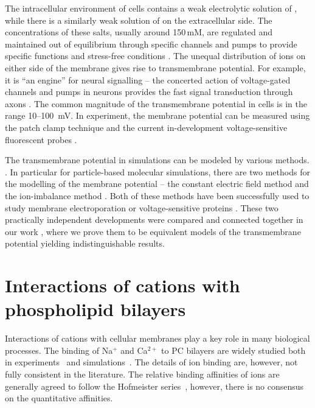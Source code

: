 The intracellular environment of cells contains a weak electrolytic solution of , 
while there is a similarly weak solution of  on the extracellular side. 
The concentrations of these salts, usually around 150\,mM, 
are regulated and maintained out of equilibrium through specific channels and pumps 
to provide specific functions and stress-free conditions \citep{Bezanilla2008, Knudsen_book2002}. 
The unequal distribution of ions on either side of the membrane
gives rise to transmembrane potential. 
For example, it is ``an engine'' for neural signalling --
the concerted action of voltage-gated channels and pumps in neurons 
provides the fast signal transduction through axons \citep{Knudsen_book2002, Storace2015, Sung2015}. 
The common magnitude of the transmembrane potential in cells is in the range 10--100~mV. 
In experiment, the membrane potential can be measured using the patch clamp technique \citep{Bezanilla2008}
and the current in-development voltage-sensitive fluorescent probes \citep{Storace2015, Sung2015}. 

The transmembrane potential in simulations can be modeled by various methods. \citep{Roux1997,Tieleman2001,Sin2015, Roux2008,Gumbart2012, sachs04_potential,Delemotte2008}.
In particular for particle-based molecular simulations, 
there are two methods for the modelling of the membrane potential --
 the constant electric field method \citep{Roux1997,Roux2008,Gumbart2012} and
 the ion-imbalance method \citep{sachs04_potential,Delemotte2008}. 
Both of these methods have been successfully used to study membrane electroporation or voltage-sensitive proteins \citep{Vargas2012, bockmann_kinetics_2008, gumbart_constant_2012, kutzner_computational_2011, casciola_molecular_2014}. 
These two practically independent developments were compared and connected together in our work \citep{melcr16},
where we prove them to be equivalent models of the transmembrane potential yielding indistinguishable results. 






\section{Interactions of cations with phospholipid bilayers}

Interactions of cations with cellular membranes play a key role in many biological processes. 
The binding of Na$^+$ and Ca$^{2+}$ to PC bilayers are widely studied both in
experiments~\citep{akutsu81,altenbach84,seelig90,cevc90,tocanne90,binder02,pabst07,uhrikova08}
and simulations~\citep{magarkar2017, bockmann03,bockmann04,berkowitz12,melcrova16,javanainen17, catte16, nmrlipids_proj4}.
The details of ion binding are, however, not fully consistent in the literature.
The relative binding affinities of ions are generally agreed to
follow the Hofmeister series~\citep{eisenberg79,cevc90,tocanne90,binder02,celma07,leontidis09,vacha09a,klasczyk10,harb13}, 
however,
there is no consensus on the quantitative affinities. 

